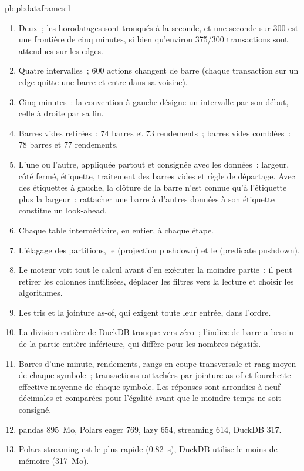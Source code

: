 \begin{solution}{pb:pl:dataframes:1}
\begin{enumerate}
\item Deux~; les horodatages sont tronqués à la seconde, et une seconde sur 300 est une frontière de cinq minutes, si bien qu'environ 375/300 transactions sont
attendues sur les edges.
\item Quatre intervalles~; 600 actions changent de barre (chaque transaction sur un edge quitte une barre et entre dans sa voisine).
\item Cinq minutes~: la convention à gauche désigne un intervalle par son début, celle à droite par sa fin.
\item Barres vides retirées~: 74 barres et 73 rendements~; barres vides comblées~: 78 barres et 77 rendements.
\item L'une ou l'autre, appliquée partout et consignée avec les données~: largeur, côté fermé, étiquette, traitement des barres vides et règle de départage. Avec
des étiquettes à gauche, la clôture de la barre n'est connue qu'à l'étiquette plus la largeur~: rattacher une barre à d'autres données à son étiquette constitue un look-ahead.
\item Chaque table intermédiaire, en entier, à chaque étape.
\item L'élagage des partitions, le  (projection pushdown) et le  (predicate pushdown).
\item Le moteur voit tout le calcul avant d'en exécuter la moindre partie~: il peut retirer les colonnes inutilisées, déplacer les filtres vers la lecture et choisir
les algorithmes.
\item Les tris et la jointure as-of, qui exigent toute leur entrée, dans l'ordre.
\item La division entière de DuckDB tronque vers zéro~; l'indice de barre a besoin de la partie entière inférieure, qui diffère pour les nombres négatifs.
\item Barres d'une minute, rendements, rangs en coupe transversale et rang moyen de chaque symbole~; transactions rattachées par jointure as-of et
fourchette effective moyenne de chaque symbole. Les réponses sont arrondies à neuf décimales et comparées pour l'égalité avant que le moindre temps ne soit consigné.
\item pandas 895~Mo, Polars eager 769, lazy 654, streaming 614, DuckDB 317.
\item Polars streaming est le plus rapide (0.82~s), DuckDB utilise le moins de mémoire (317~Mo).

\end{enumerate}
\end{solution}
